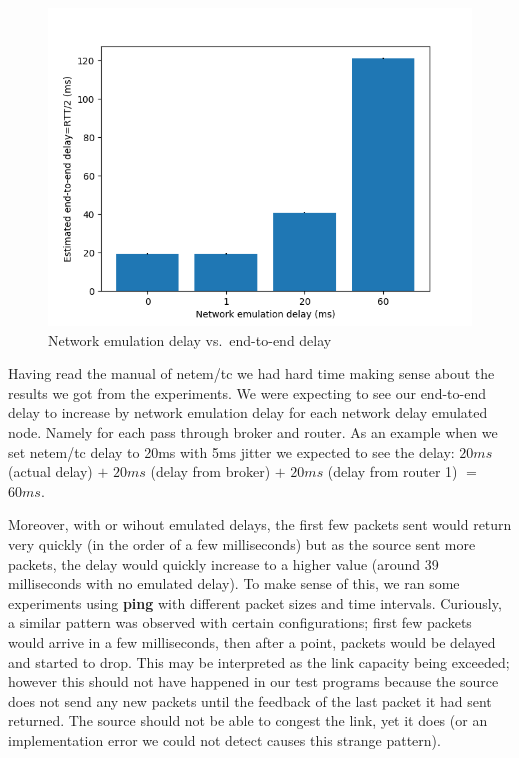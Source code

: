 \documentclass[conference]{IEEEtran}
\begin{document}
\begin{figure}
    \centering
    \includegraphics[scale=0.6]{graphics/plt}
    \caption{Network emulation delay vs.\ end-to-end delay}\label{fig:graph}
\end{figure}

Having read the manual of netem/tc we had hard time making sense about the results we got from the experiments. We were expecting to see our end-to-end delay to increase by network emulation delay for each network delay emulated node. Namely for each pass through broker and router. As an example when we set netem/tc delay to 20ms with 5ms jitter we expected to see the delay: $20ms$ (actual delay) $+$ $20ms$ (delay from broker) $+$ $20ms$ (delay from router 1) $=$ $60ms$.

Moreover, with or wihout emulated delays, the first few packets sent would return
very quickly (in the order of a few milliseconds) but as the source sent more packets,
the delay would quickly increase to a higher value (around 39 milliseconds with no
emulated delay). To make sense of this, we ran some experiments using \textbf{ping}
with different packet sizes and time intervals. Curiously, a similar pattern was observed
with certain configurations; first few packets would arrive in a few milliseconds, then
after a point, packets would be delayed and started to drop. This may be interpreted
as the link capacity being exceeded; however this should not have happened in our test programs
because the source does not send any new packets until the feedback of the last packet it had sent
returned. The source should not be able to congest the link, yet it does
(or an implementation error we could not detect causes this strange pattern).
\end{document}
